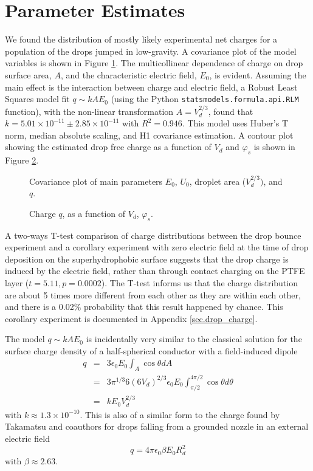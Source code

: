 \documentclass[12pt,a4paper,oneside]{book}
\begin{document}
\section{Parameter Estimates}
We found the distribution of mostly likely experimental net charges for a population of the drops jumped in low-gravity. A covariance plot of the model variables is shown in Figure \ref{fig:scatter}. The multicollinear dependence of charge on drop surface area, $A$, and the characteristic electric field, $E_0$, is evident. Assuming the main effect is the interaction between charge and electric field, a Robust Least Squares model fit $q \sim kAE_0$ (using the Python \verb|statsmodels.formula.api.RLM| function), with the non-linear transformation $A = V_d^{2/3}$, found that $k=5.01 \times 10^{-11} \pm  2.85 \times 10^{-11}$ with $R^2 = 0.946$. This model uses Huber's T norm, median absolute scaling, and H1 covariance estimation. A contour plot showing the estimated drop free charge as a function of $V_d$ and $\varphi_s$ is shown in Figure \ref{fig:charge}.
\begin{figure}[h]
    \centering
    \resizebox{12cm}{!}{}
    \caption{Covariance plot of main parameters $E_0$, $U_0$, droplet area ($V_d^{2/3})$, and $q$.\label{fig:scatter}}
\end{figure}
\begin{figure}[h]
    \centering
    
    \caption{Charge $q$, as a function of $V_d$, $\varphi_s$.\label{fig:charge}}
\end{figure}

A two-ways T-test comparison of charge distributions between the drop bounce experiment and a corollary experiment with zero electric field at the time of drop deposition on the superhydrophobic surface suggests that the drop charge is induced by the electric field, rather than through contact charging on the PTFE layer ($t = 5.11, p = 0.0002$). The T-test informs us that the charge distribution  are about 5 times more different from each other as they are within each other, and there is a 0.02$\%$ probability that this result happened by chance. This corollary experiment is documented in Appendix \ref{sec.drop_charge}.

The model $q \sim kAE_0$ is incidentally very similar to the classical solution for the surface charge density of a half-spherical conductor with a field-induced dipole\cite{david_j._griffiths_introduction_1999}
\begin{eqnarray*}
q &=& 3 \epsilon_0 E_0 \int_A \cos \theta dA \\
&=& 3 \pi^{1/3} 6 \left(6 V_d \right)^{2/3} \epsilon_0 E_0 \int^{4 \pi/2}_{\pi / 2} \cos \theta d\theta \\
&=& k E_0 V_d^{2/3}
\end{eqnarray*}
with $k \approx 1.3 \times 10^{-10}$. This is also of a similar form to the charge found by Takamatsu and coauthors for drops falling from a grounded nozzle in an external electric field\cite{takamatsu_theoretical_1981}
\[q = 4 \pi \epsilon_0 \beta E_0 R_d^2 \]
with $\beta \approx 2.63$.
\end{document}
